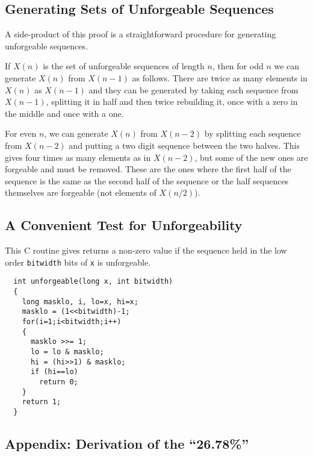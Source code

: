 \documentclass[12pt]{article}
\begin{document}
\subsection*{Generating Sets of Unforgeable Sequences}

A side-product of this proof is a straightforward procedure for generating
unforgeable sequences.

If $X(n)$ is the set of unforgeable sequences of length $n$, then for odd $n$ we
can generate $X(n)$ from $X(n-1)$ as follows.  There are twice as many elements
in  $X(n)$ as $X(n-1)$ and they can be generated by taking each sequence from
$X(n-1)$, splitting it in half and then twice rebuilding it, once with
a zero in the middle and once with a one.

For even $n$, we can generate $X(n)$ from $X(n-2)$ by splitting
each sequence from $X(n-2)$ and putting a two digit sequence between
the two halves. This gives four times as many elements as in $X(n-2)$,
but some of the new ones are forgeable and must be removed.  These are
the ones where the first half of the sequence is the same as the second half
of the sequence or the half sequences themselves are forgeable (not elements of 
$X(n/2)$).

\subsection*{A Convenient Test for Unforgeability}

This C routine gives returns a non-zero value 
if the sequence held in
the low order {\tt bitwidth} bits of {\tt x} is unforgeable.


\begin{verbatim}
  int unforgeable(long x, int bitwidth)
  {
    long masklo, i, lo=x, hi=x;
    masklo = (1<<bitwidth)-1;
    for(i=1;i<bitwidth;i++)
    {
      masklo >>= 1;
      lo = lo & masklo;
      hi = (hi>>1) & masklo;
      if (hi==lo)
        return 0;
    }
    return 1;
  }
\end{verbatim}

\subsection*{Appendix: Derivation of the ``26.78\%''}
\end{document}
